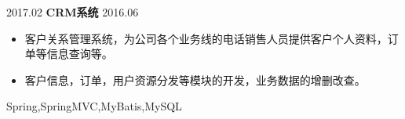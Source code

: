 \begin{projects}
  \project
    {2017.02}   {\textbf{CRM系统}}
    {2016.06} {
                      \begin{itemize}
                        \item 客户关系管理系统，为公司各个业务线的电话销售人员提供客户个人资料，订单等信息查询等。
                        \item 客户信息，订单，用户资源分发等模块的开发，业务数据的增删改查。
                      \end{itemize}
                    }
                    {Spring,SpringMVC,MyBatis,MySQL}
  \emptySeparator
\end{projects}
